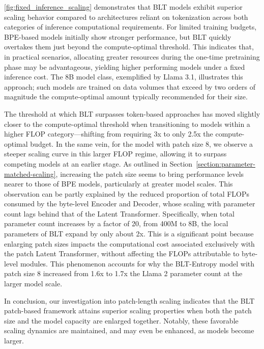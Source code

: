 \autoref{fig:fixed_inference_scaling} demonstrates that {\textsc BLT} models exhibit superior scaling behavior compared to architectures reliant on tokenization across both categories of inference computational requirements. For limited training budgets, BPE-based models initially show stronger performance, but {\textsc BLT} quickly overtakes them just beyond the compute-optimal threshold. This indicates that, in practical scenarios, allocating greater resources during the one-time pretraining phase may be advantageous, yielding higher performing models under a fixed inference cost. The 8B model class, exemplified by Llama 3.1, illustrates this approach; such models are trained on data volumes that exceed by two orders of magnitude the compute-optimal amount typically recommended for their size.

The threshold at which {\textsc BLT} surpasses token-based approaches has moved slightly closer to the compute-optimal threshold when transitioning to models within a higher FLOP category—shifting from requiring 3x to only 2.5x the compute-optimal budget. In the same vein, for the model with patch size 8, we observe a steeper scaling curve in this larger FLOP regime, allowing it to surpass competing models at an earlier stage. As outlined in Section~\ref{section:parameter-matched-scaling}, increasing the patch size seems to bring performance levels nearer to those of BPE models, particularly at greater model scales. This observation can be partly explained by the reduced proportion of total FLOPs consumed by the byte-level Encoder and Decoder, whose scaling with parameter count lags behind that of the Latent Transformer. Specifically, when total parameter count increases by a factor of 20, from 400M to 8B, the local parameters of {\textsc BLT} expand by only about 2x. This is a significant point because enlarging patch sizes impacts the computational cost associated exclusively with the patch Latent Transformer, without affecting the FLOPs attributable to byte-level modules. This phenomenon accounts for why the {\textsc BLT}-Entropy model with patch size 8 increased from 1.6x to 1.7x the Llama 2 parameter count at the larger model scale.

In conclusion, our investigation into patch-length scaling indicates that the {\textsc BLT} patch-based framework attains superior scaling properties when both the patch size and the model capacity are enlarged together. Notably, these favorable scaling dynamics are maintained, and may even be enhanced, as models become larger.

